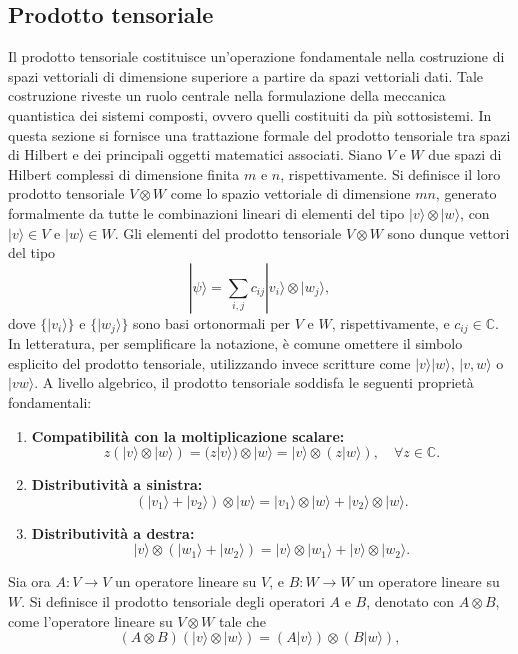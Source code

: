 \documentclass[a4paper,12pt]{report}
\theoremstyle{plain}
\begin{document}
\subsection{Prodotto tensoriale}
Il prodotto tensoriale costituisce un'operazione fondamentale nella costruzione di spazi vettoriali di dimensione superiore a partire da spazi vettoriali dati. Tale costruzione riveste un ruolo centrale nella formulazione della meccanica quantistica dei sistemi composti, ovvero quelli costituiti da più sottosistemi. In questa sezione si fornisce una trattazione formale del prodotto tensoriale tra spazi di Hilbert e dei principali oggetti matematici associati.
Siano $V$ e $W$ due spazi di Hilbert complessi di dimensione finita $m$ e $n$, rispettivamente. Si definisce il loro prodotto tensoriale $V \otimes W$ come lo spazio vettoriale di dimensione $mn$, generato formalmente da tutte le combinazioni lineari di elementi del tipo $|v\rangle \otimes |w\rangle$, con $|v\rangle \in V$ e $|w\rangle \in W$. Gli elementi del prodotto tensoriale $V \otimes W$ sono dunque vettori del tipo
$$ |\psi\rangle = \sum_{i,j} c_{ij} |v_i\rangle \otimes |w_j\rangle, $$
dove $\{|v_i\rangle\}$ e $\{|w_j\rangle\}$ sono basi ortonormali per $V$ e $W$, rispettivamente, e $c_{ij} \in \mathbb{C}$. In letteratura, per semplificare la notazione, è comune omettere il simbolo esplicito del prodotto tensoriale, utilizzando invece scritture come $|v\rangle|w\rangle$, $|v, w\rangle$ o $|vw\rangle$.
A livello algebrico, il prodotto tensoriale soddisfa le seguenti proprietà fondamentali:
\begin{enumerate}
    \item \textbf{Compatibilità con la moltiplicazione scalare:}
    $$ z(|v\rangle \otimes |w\rangle) = (z|v\rangle) \otimes |w\rangle = |v\rangle \otimes (z|w\rangle), \quad \forall z \in \mathbb{C}. $$
    \item \textbf{Distributività a sinistra:}
    $$ (|v_1\rangle + |v_2\rangle) \otimes |w\rangle = |v_1\rangle \otimes |w\rangle + |v_2\rangle \otimes |w\rangle. $$
    \item \textbf{Distributività a destra:}
    $$ |v\rangle \otimes (|w_1\rangle + |w_2\rangle) = |v\rangle \otimes |w_1\rangle + |v\rangle \otimes |w_2\rangle. $$
\end{enumerate}
Sia ora $A : V \to V$ un operatore lineare su $V$, e $B : W \to W$ un operatore lineare su $W$. Si definisce il prodotto tensoriale degli operatori $A$ e $B$, denotato con $A \otimes B$, come l'operatore lineare su $V \otimes W$ tale che
$$ (A \otimes B) (|v\rangle \otimes |w\rangle) = (A|v\rangle) \otimes (B|w\rangle), $$
\end{document}

